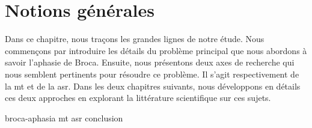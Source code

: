 \chapter{Notions générales}
\label{chap.general-notions}

Dans ce chapitre, nous traçons les grandes lignes de notre étude.
Nous commençons par introduire les détails du problème principal que nous abordons à savoir l'aphasie de Broca.
Ensuite, nous présentons deux axes de recherche qui nous semblent pertinents pour résoudre ce problème.
Il s'agit respectivement de la \gls{mt} et de la \gls{asr}.
Dans les deux chapitres suivants, 
nous développons en détails ces deux approches
en explorant la littérature scientifique sur ces sujets.

{broca-aphasia}
{mt}
{asr}
{conclusion}
